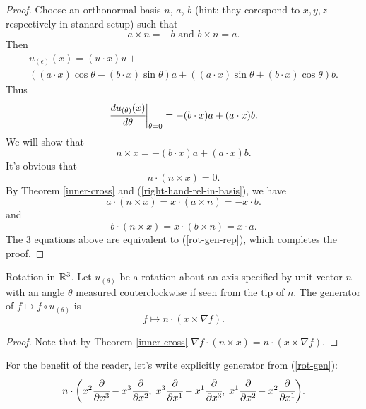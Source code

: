\documentclass[main.tex]{subfiles}
\begin{document}
\begin{proof}
Choose an orthonormal basis $n$, $a$, $b$ (hint: they corespond to $x,y,z$ respectively in stanard setup) such that
\begin{equation}
\label{right-hand-rel-in-basis}
a \times n = -b \text{ and } b \times n = a.
\end{equation}
Then
\begin{multline}
u_{(\epsilon)}(x) = (u\cdot x)u + \\
((a\cdot x)\cos\theta - (b\cdot x)\sin\theta)a
+ ((a\cdot x)\sin\theta + (b\cdot x)\cos\theta)b.
\end{multline}
Thus
\begin{equation}
\cfrac{du_{(\theta)}(x)}{d\theta}\bigg\vert_{\theta=0} 
= -(b\cdot x)a + (a\cdot x)b.
\end{equation}
We will show that 
\begin{equation}
\label{rot-gen-rep}
n\times x = -(b\cdot x)a + (a\cdot x)b.
\end{equation}
It's obvious that
\begin{equation}
n\cdot(n\times x) = 0.
\end{equation}
By Theorem \ref{inner-cross} and (\ref{right-hand-rel-in-basis}), we have
\begin{equation}
a\cdot(n\times x) = x\cdot(a\times n) = -x \cdot b.
\end{equation}
and
\begin{equation}
b\cdot(n\times x) = x\cdot(b\times n) = x \cdot a.
\end{equation}
The 3 equations above are equivalent to (\ref{rot-gen-rep}), which completes the proof.
\end{proof}
\begin{example}
Rotation in $\mathbb{R}^3$.
Let $u_{(\theta)}$ be a rotation about an axis specified by unit vector $n$ with an angle $\theta$ measured couterclockwise if seen from the tip of $n$. The generator of $f \mapsto f\circ u_{(\theta)}$ is
\begin{equation}
\label{rot-gen}
f\mapsto n\cdot(x\times \nabla f).
\end{equation}
\end{example}  
\begin{proof}
Note that by Theorem \ref{inner-cross} $\nabla f \cdot (n\times x) =
n\cdot(x\times \nabla f)$.
\end{proof}
For the benefit of the reader, let's write explicitly generator from (\ref{rot-gen}):
\begin{equation}
n\cdot\bigg(x^2\cfrac{\partial}{\partial x^3} - x^3\cfrac{\partial}{\partial x^2},\; x^3\cfrac{\partial}{\partial x^1} - x^1\cfrac{\partial}{\partial x^3},\; x^1\cfrac{\partial}{\partial x^2} - x^2\cfrac{\partial}{\partial x^1}\bigg).
\end{equation}
\end{document}
